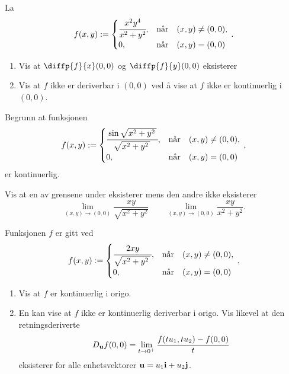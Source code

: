 \oppgave[K2015, Oppgave 1] La
%
\begin{equation*}
  f(x, y) :=
  \begin{cases}
    \cfrac{x^2y^4}{x^2 + y^2}, & \text{når} \quad (x,y) \neq (0,0), \\
    0, & \text{når} \quad (x,y) = (0,0)
  \end{cases}\,.
\end{equation*}
%
\begin{enumerate}
  \item Vis at $\diffp{f}{x}(0,0)$ og $\diffp{f}{y}(0,0)$ eksisterer
  \item Vis at $f$ ikke er deriverbar i $(0,0)$ ved å vise at $f$ ikke er
    kontinuerlig i $(0,0)$.
\end{enumerate}

\oppgave[K2014, Oppgave 3] Begrunn at funksjonen
%
\begin{equation*}
  f(x, y) :=
  \begin{cases}
    \cfrac{\sin \sqrt{x^2+y^2\,}\,}{\sqrt{x^2 + y^2\,}\,}, & \text{når} \quad (x,y) \neq (0,0), \\
    0, & \text{når} \quad (x,y) = (0,0)
  \end{cases}\,,
\end{equation*}
%
er kontinuerlig.

\oppgave[K2013, Oppgave 3] Vis at en av grensene under eksisterer mens den andre
ikke eksisterer
%
\begin{equation*}
  \lim_{(x,y)\to(0,0)} \frac{xy}{\sqrt{x^2+y^2}}
  \qquad
  \lim_{(x,y)\to(0,0)} \frac{xy}{x^2 + y^2}.
\end{equation*}


\oppgave[K2012, Oppgave 5] Funksjonen $f$ er gitt ved
%
\begin{equation*}
  f(x, y) :=
  \begin{cases}
    \cfrac{2xy}{\sqrt{x^2 + y^2\,}\,}, & \text{når} \quad (x,y) \neq (0,0), \\
    0, & \text{når} \quad (x,y) = (0,0)
  \end{cases}\,,
\end{equation*}
%
\begin{enumerate}
  \item Vis at $f$ er kontinuerlig i origo.
  \item En kan vise at $f$ ikke er kontinuerlig deriverbar i origo. Vis likevel
    at den retningsderiverte
    \begin{equation*}
      D_{\mathbf{u}}f(0,0) = \lim_{t \to 0^+} \frac{f(t u_1, t u_2) - f(0,0)}{t}
    \end{equation*}
    eksisterer for alle enhetsvektorer $\mathbf{u} = u_1 \mathbf{i} + u_2 \mathbf{j}$.
\end{enumerate}

